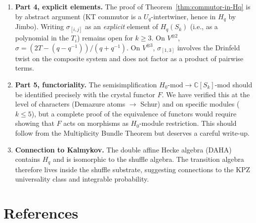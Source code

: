 \documentclass[11pt]{article}
\theoremstyle{remark}
\newcommand{\CC}{\mathbb{C}}
\newcommand{\Mod}{\text{-mod}}
\begin{document}
\begin{enumerate}
  \item \textbf{Part 4, explicit elements.}
  The proof of Theorem~\ref{thm:commutor-in-Hq} is by abstract argument
  (KT commutor is a $U_q$-intertwiner, hence in $H_q$ by Jimbo).
  Writing $\sigma_{[i,j]}$ as an \emph{explicit} element of $H_q(S_k)$
  (i.e., as a polynomial in the $T_i$) remains open for $k \ge 3$.
  On $V^{\otimes 2}$, $\sigma = (2T - (q-q^{-1}))/(q+q^{-1})$.
  On $V^{\otimes 3}$, $\sigma_{[1,3]}$ involves the Drinfeld twist on
  the composite system and does not factor as a product of pairwise terms.

  \item \textbf{Part 5, functoriality.}
  The semisimplification $H_0\Mod \to \CC[S_k]\Mod$ should be identified
  precisely with the crystal functor $F$. We have verified this at the level
  of characters (Demazure atoms $\to$ Schur) and on specific modules ($k \le 5$),
  but a complete proof of the equivalence of functors would require showing that
  $F$ acts on morphisms as $H_0$-module restriction. This should follow from
  the Multiplicity Bundle Theorem but deserves a careful write-up.

  \item \textbf{Connection to Kalmykov.}
  The double affine Hecke algebra (DAHA) contains $H_q$ and is isomorphic
  to the shuffle algebra. The transition algebra therefore lives inside
  the shuffle substrate, suggesting connections to the KPZ universality
  class and integrable probability.
\end{enumerate}

\section*{References}
\end{document}
